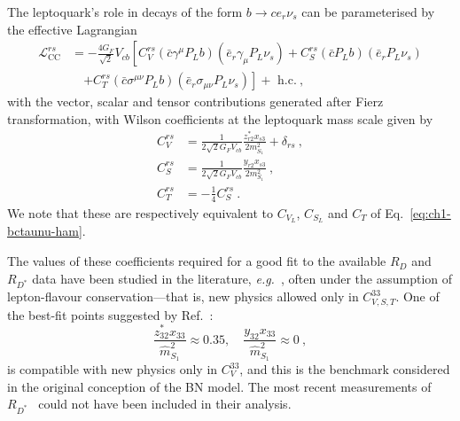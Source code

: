 The leptoquark's role in decays of the form $b \rightarrow c e_r \nu_{s}$ can
be parameterised by the effective Lagrangian~\cite{Sakaki:2013bfa}
\begin{equation}
  \label{eq:ch3-CCHam}
  \begin{split}
    \mathscr{L}^{rs}_{\text{CC}} &= -\frac{4 G_F}{\sqrt{2}} V_{cb} \left[
      C_V^{rs}(\bar{c} \gamma^\mu P_L b)(\bar{e}_r \gamma_\mu P_L
      \nu_{s}) + C^{rs}_S (\bar{c}P_L b)(\bar{e}_r P_L\nu_{s}) \right. \\
    &\quad \left. + C^{rs}_T (\bar{c} \sigma^{\mu \nu} P_L b)
      (\bar{e}_r \sigma_{\mu \nu} P_L \nu_{s})\right] + \text{ h.c.} \ ,
  \end{split}
\end{equation}
with the vector, scalar and tensor contributions generated after Fierz
transformation, with Wilson coefficients at the leptoquark mass scale given by
\begin{subequations}
  \label{eq:ch3-ccoperators}
  \begin{align}
    C_V^{rs} &= \frac{1}{2 \sqrt{2} G_F V_{cb}} \frac{z_{r2}^* x_{s3}}{2m_{S_{1}}^2} + \delta_{rs} \ , \\
    C_S^{rs} &= \frac{1}{2 \sqrt{2} G_F V_{cb}} \frac{y_{r 2} x_{s 3}}{2m_{S_{1}}^2} \ , \\
    C_T^{rs} &= -\frac{1}{4} C_S^{rs} \ .
  \end{align}
\end{subequations}
We note that these are respectively equivalent to $C_{V_{L}}$, $C_{S_{L}}$ and
$C_{T}$ of Eq.~\eqref{eq:ch1-bctaunu-ham}.

The values of these coefficients required for a good fit to the available $R_D$
and $R_{D^{*}}$ data have been studied in the literature,
\textit{e.g.}~\cite{Sakaki:2013bfa, Bardhan:2016uhr, Freytsis:2015qca, Choudhury:2016ulr,
  Bhattacharya:2016zcw, Bhattacharya:2015ida}, often under the assumption of
lepton-flavour conservation---that is, new physics allowed only in
$C_{V,S,T}^{33}$. One of the best-fit points suggested by
Ref.~\cite{Freytsis:2015qca}:
\begin{equation} \label{eq:ch3-bfp}
  \frac{z_{32}^* x_{33}}{\hat{m}_{S_{1}}^2} \approx 0.35, \quad \frac{y_{32} x_{33}}{\hat{m}_{S_{1}}^2} \approx 0 \ ,
\end{equation}
is compatible with new physics only in $C_V^{33}$, and this is the benchmark
considered in the original conception of the BN model. The most recent
measurements of $R_{D^*}$~\cite{Hirose:2016wfn, Hirose:2017dxl,
  Abdesselam:2019dgh, Aaij:2017uff, Aaij:2017deq} could not have been included
in their analysis.

